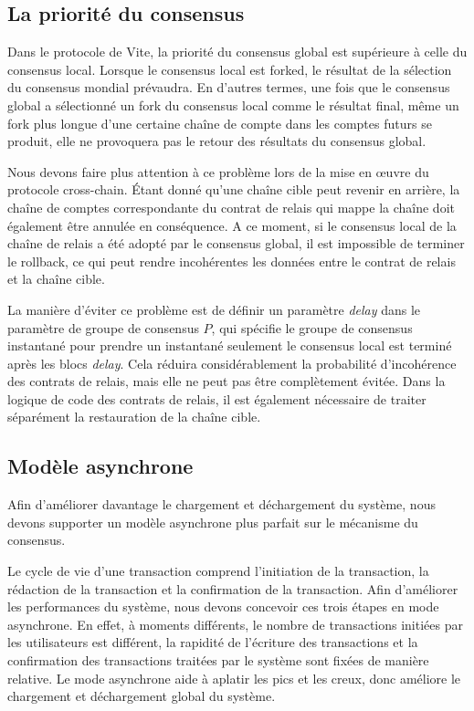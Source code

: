\documentclass[UTF8,nofonts]{article}
\begin{document}
\begin{multicols}{2}
\subsection{La priorité du consensus}\label{sec:consensus-prio}
Dans le protocole de Vite, la priorité du consensus global est supérieure à celle du consensus local. Lorsque le consensus local est forked, le résultat de la sélection du consensus mondial prévaudra. En d'autres termes, une fois que le consensus global a sélectionné un fork du consensus local comme le résultat final, même un fork plus longue d'une certaine chaîne de compte dans les comptes futurs se produit, elle ne provoquera pas le retour des résultats du consensus global.

Nous devons faire plus attention à ce problème lors de la mise en œuvre du protocole cross-chain. Étant donné qu'une chaîne cible peut revenir en arrière, la chaîne de comptes correspondante du contrat de relais qui mappe la chaîne doit également être annulée en conséquence. A ce moment, si le consensus local de la chaîne de relais a été adopté par le consensus global, il est impossible de terminer le rollback, ce qui peut rendre incohérentes les données entre le contrat de relais et la chaîne cible.

La manière d'éviter ce problème est de définir un paramètre \textit{delay}  dans le paramètre de groupe de consensus $P$, qui spécifie le groupe de consensus instantané pour prendre un instantané seulement le consensus local est terminé après les blocs \textit{delay}. Cela réduira considérablement la probabilité d'incohérence des contrats de relais, mais elle ne peut pas être complètement évitée. Dans la logique de code des contrats de relais, il est également nécessaire de traiter séparément la restauration de la chaîne cible.

\subsection{Modèle asynchrone}
Afin d'améliorer davantage le chargement et déchargement du système, nous devons supporter un modèle asynchrone plus parfait sur le mécanisme du consensus.

Le cycle de vie d'une transaction comprend l'initiation de la transaction, la rédaction de la transaction et la confirmation de la transaction. Afin d'améliorer les performances du système, nous devons concevoir ces trois étapes en mode asynchrone. En effet, à moments différents, le nombre de transactions initiées par les utilisateurs est différent, la rapidité de l'écriture des transactions et la confirmation des transactions traitées par le système sont fixées de manière relative. Le mode asynchrone aide à aplatir les pics et les creux, donc améliore le chargement et déchargement global du système.
 


\end{multicols}
\end{document}
